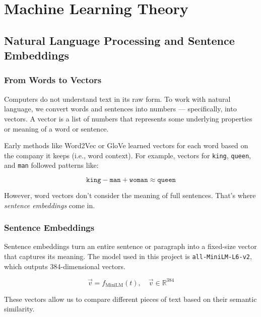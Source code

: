 \chapter{Machine Learning Theory}
\label{appendix:theory}

\section{Natural Language Processing and Sentence Embeddings}
\label{sec:theory-nlp}

\subsection*{From Words to Vectors}

Computers do not understand text in its raw form. To work with natural language, we convert words and sentences into numbers — specifically, into vectors. A vector is a list of numbers that represents some underlying properties or meaning of a word or sentence.

Early methods like Word2Vec or GloVe learned vectors for each word based on the company it keeps (i.e., word context). For example, vectors for \texttt{king}, \texttt{queen}, and \texttt{man} followed patterns like:

\[
\texttt{king} - \texttt{man} + \texttt{woman} \approx \texttt{queen}
\]

However, word vectors don't consider the meaning of full sentences. That's where \textit{sentence embeddings} come in.

\subsection*{Sentence Embeddings}

Sentence embeddings turn an entire sentence or paragraph into a fixed-size vector that captures its meaning. The model used in this project is \texttt{all-MiniLM-L6-v2}, which outputs 384-dimensional vectors.

\[
\vec{v} = f_{\text{MiniLM}}(t), \quad \vec{v} \in \mathbb{R}^{384}
\]

These vectors allow us to compare different pieces of text based on their semantic similarity.

